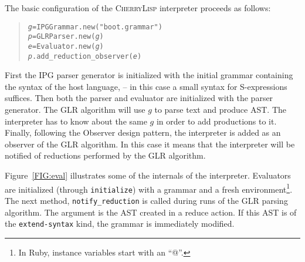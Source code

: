 \documentclass[a4paper]{llncs}
\def\cherrylisp{\textsc{CherryLisp}\xspace}
\def\mytextit#1{\textrm{\textit{#1}}}
\def\Var#1{\mytextit{#1}}
\begin{document}
The basic configuration of the \cherrylisp interpreter proceeds as
follows:
\begin{quote}
\begin{alltt}
\Var{g} = IPGGrammar.new("boot.grammar")
\Var{p} = GLRParser.new(\Var{g})
\Var{e} = Evaluator.new(\Var{g})
\Var{p}.add_reduction_observer(\Var{e})
\end{alltt}
\end{quote}
First the IPG parser generator is initialized with the initial grammar
containing the syntax of the host language, -- in this case a small
syntax for S-expressions suffices. Then both the parser and evaluator
are initialized with the parser generator. The GLR algorithm will use
$g$ to parse text and produce AST. The interpreter has to know about
the same $g$ in order to add productions to it. Finally, following the
Observer design pattern, the interpreter is added as an observer of
the GLR algorithm. In this case it means that the interpreter will be
notified of reductions performed by the GLR algorithm.

Figure~\ref{FIG:eval} illustrates some of the internals of the
interpreter. Evaluators are initialized (through \texttt{initialize})
with a grammar and a fresh environment\footnote{In Ruby, instance
  variables start with an ``@''.}. The next method,
\texttt{notify\_reduction} is called during runs of the GLR parsing
algorithm. The argument is the AST created in a reduce action. If this
AST is of the \texttt{extend-syntax} kind, the grammar is immediately
modified. 
\end{document}
